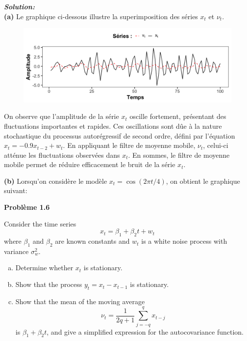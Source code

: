 \documentclass{homework}
\begin{document}
\textit{\textbf{Solution:}}\\
\textbf{(a)} Le graphique ci-dessous illustre la superimposition des séries $x_t$ et $\nu_t$. 

\begin{figure}[h]
    \centering
    \includegraphics[width=1\linewidth]{figure1.3a.png}
\end{figure}

On observe que l'amplitude de la série $x_t$ oscille fortement, présentant des fluctuations importantes et rapides. Ces oscillations sont dûe à la nature stochastique du processus autorégressif de second ordre, défini par l'équation $x_t = -0.9x_{t-2} + w_t$. En appliquant le filtre de moyenne mobile, $\nu_t$, celui-ci atténue les fluctuations observées dans $x_t$. En sommes, le filtre de moyenne mobile permet de réduire efficacement le bruit de la série $x_t$.

\textbf{(b)} Lorsqu'on considère le modèle $x_t = \cos(2 \pi t/4)$, on obtient le graphique suivant:











\newpage
\textbf{\Large{Problème 1.6}}

Consider the time series $$x_t = \beta_1 + \beta_2 t + w_t$$
where $\beta_1$ and $\beta_2$ are known constants and $w_t$ is a white noise process with variance $\sigma^2_w$.

\begin{enumerate}[(a)]
    \item Determine whether $x_t$ is stationary.
    \item Show that the process $y_t = x_t - x_{t-1}$ is stationary.
    \item Show that the mean of the moving average
    $$\nu_t = \frac{1}{2q + 1} \sum_{j=-q}^{q}x_{t-j}$$
    is $\beta_1 + \beta_2 t$, and give a simplified expression for the autocovariance function.
\end{enumerate}
\end{document}
